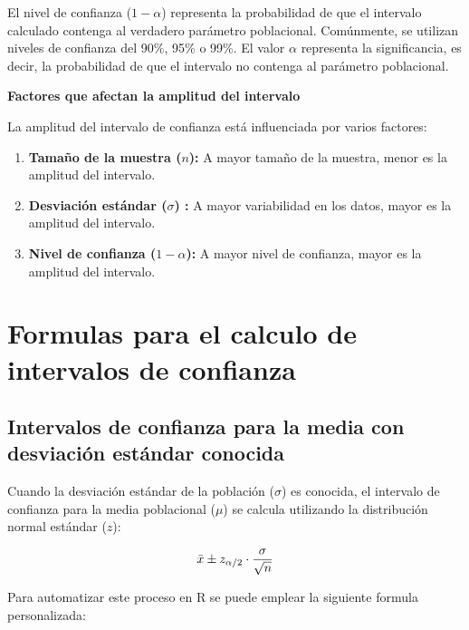 \documentclass[
  spanish,
  letterpaper,
]{book}
\begin{document}
El nivel de confianza (\(1 - \alpha\)) representa la probabilidad de que
el intervalo calculado contenga al verdadero parámetro poblacional.
Comúnmente, se utilizan niveles de confianza del 90\%, 95\% o 99\%. El
valor \(\alpha\) representa la significancia, es decir, la probabilidad
de que el intervalo no contenga al parámetro poblacional.

\textbf{Factores que afectan la amplitud del intervalo}

La amplitud del intervalo de confianza está influenciada por varios
factores:

\begin{enumerate}
\def\labelenumi{\arabic{enumi}.}
\item
  \textbf{Tamaño de la muestra (}\(n\)\textbf{):} A mayor tamaño de la
  muestra, menor es la amplitud del intervalo.
\item
  \textbf{Desviación estándar (}\(\sigma\)\textbf{) :} A mayor
  variabilidad en los datos, mayor es la amplitud del intervalo.
\item
  \textbf{Nivel de confianza (}\(1 - \alpha\)\textbf{):} A mayor nivel
  de confianza, mayor es la amplitud del intervalo.
\end{enumerate}

\section{Formulas para el calculo de intervalos de
confianza}\label{formulas-para-el-calculo-de-intervalos-de-confianza}

\subsection{Intervalos de confianza para la media con desviación
estándar
conocida}\label{intervalos-de-confianza-para-la-media-con-desviaciuxf3n-estuxe1ndar-conocida}

Cuando la desviación estándar de la población (\(\sigma\)) es conocida,
el intervalo de confianza para la media poblacional (\(\mu\)) se calcula
utilizando la distribución normal estándar (\(z\)):

\[\huge \bar{x} \pm z_{\alpha/2} \cdot \frac{\sigma}{\sqrt{n}}\]

Para automatizar este proceso en R se puede emplear la siguiente formula
personalizada:
\end{document}
